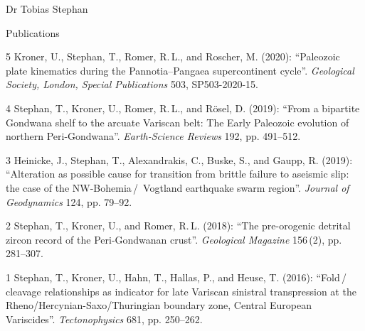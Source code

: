 \documentclass[10pt, paper=letter]{scrartcl} %
\begin{document}
\begin{cv}{Dr Tobias Stephan}
\begin{cvlist}{Publications}
    \item[5] Kroner, U., Stephan, T., Romer, R.\,L., and Roscher, M. (2020): \enquote{Paleozoic plate kinematics during the Pannotia--Pangaea supercontinent cycle}. \textit{Geological Society, London, Special Publications} 503, SP503-2020-15. 
%
    \item[4] Stephan, T., Kroner, U., Romer, R.\,L., and R\"osel, D. (2019): \enquote{From a bipartite Gondwana shelf to the arcuate Variscan belt: The Early Paleozoic evolution of northern Peri-Gondwana}. \textit{Earth-Science Reviews} 192, pp. 491--512.  
    \item[3] Heinicke, J., Stephan, T., Alexandrakis, C., Buske, S., and Gaupp, R. (2019): \enquote{Alteration as possible cause for transition from brittle failure to aseismic slip: the case of the NW-Bohemia\,/\, Vogtland earthquake swarm region}. \textit{Journal of Geodynamics} 124, pp. 79--92. 
    \item[2] Stephan, T., Kroner, U., and Romer, R.\,L. (2018): \enquote{The pre-orogenic detrital zircon record of the Peri-Gondwanan crust}. \textit{Geological Magazine} 156\,(2), pp. 281--307.\newline
    \item[1] Stephan, T., Kroner, U., Hahn, T., Hallas, P., and Heuse, T. (2016): \enquote{Fold\,/\,cleavage relationships as indicator for late Variscan sinistral transpression at the Rheno\-/Hercynian\--Saxo\-/Thuringian boundary zone, Central European Variscides}. \textit{Tectonophysics} 681, pp. 250--262. 

    

\end{cvlist}
\end{cv}
\end{document}
